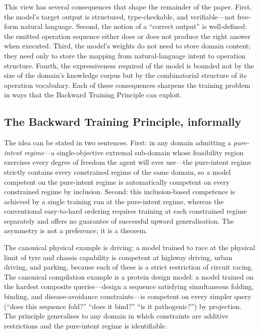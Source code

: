 \documentclass[twocolumn,11pt,a4paper]{article}
\begin{document}
This view has several consequences that shape the remainder of the paper. First, the model's target output is structured, type-checkable, and verifiable---not free-form natural language. Second, the notion of a ``correct output'' is well-defined: the emitted operation sequence either does or does not produce the right answer when executed. Third, the model's weights do not need to store domain content; they need only to store the mapping from natural-language intent to operation structure. Fourth, the expressiveness required of the model is bounded not by the size of the domain's knowledge corpus but by the combinatorial structure of its operation vocabulary. Each of these consequences sharpens the training problem in ways that the Backward Training Principle can exploit.

\subsection{The Backward Training Principle, informally}
\label{sec:btp-informal}

The idea can be stated in two sentences. First: in any domain admitting a \emph{pure-intent regime}---a single-objective extremal sub-domain whose feasibility region exercises every degree of freedom the agent will ever use---the pure-intent regime strictly contains every constrained regime of the same domain, so a model competent on the pure-intent regime is automatically competent on every constrained regime by inclusion. Second: this inclusion-based competence is achieved by a single training run at the pure-intent regime, whereas the conventional easy-to-hard ordering requires training at each constrained regime separately and offers no guarantee of successful upward generalisation. The asymmetry is not a preference; it is a theorem.

The canonical physical example is driving: a model trained to race at the physical limit of tyre and chassis capability is competent at highway driving, urban driving, and parking, because each of these is a strict restriction of circuit racing. The canonical compilation example is a protein design model: a model trained on the hardest composite queries---design a sequence satisfying simultaneous folding, binding, and disease-avoidance constraints---is competent on every simpler query (``does this sequence fold?'' ``does it bind?'' ``is it pathogenic?'') by projection. The principle generalises to any domain in which constraints are additive restrictions and the pure-intent regime is identifiable.
\end{document}
